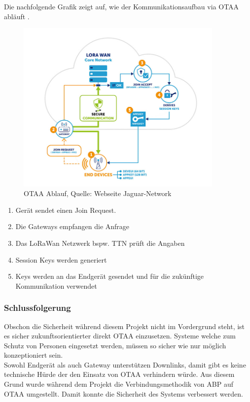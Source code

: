 \documentclass[11pt,english,german]{report}
\theoremstyle{definition}
\begin{document}
\newpage
\noindent
Die nachfolgende Grafik zeigt auf, wie der Kommunikationsaufbau via OTAA abläuft \cite{jaguar}.
\begin{figure}[H]
	\centering
	\includegraphics[width=0.9\textwidth]{img/lora/otaa_schema.png}
	\caption[OTAA Ablauf]
	{OTAA Ablauf, Quelle: Webseite Jaguar-Network \protect\cite{jaguar}}
\end{figure}

\begin{enumerate}
	\item Gerät sendet einen Join Request.
	\item Die Gateways empfangen die Anfrage
	\item Das LoRaWan Netzwerk  bspw. TTN prüft die Angaben
	\item Session Keys werden generiert
	\item Keys werden an das Endgerät gesendet und für die zukünftige Kommunikation verwendet
\end{enumerate}

\newpage
\subsubsection{Schlussfolgerung}
Obschon die Sicherheit während diesem Projekt nicht im Vordergrund steht, ist es sicher zukunftsorientierter direkt OTAA einzusetzen. Systeme welche zum Schutz von Personen eingesetzt werden, müssen so sicher wie nur möglich konzeptioniert sein.\\[0.3cm]
Sowohl Endgerät als auch Gateway unterstützen Downlinks, damit gibt es keine technische Hürde der den Einsatz von OTAA verhindern würde. Aus diesem Grund wurde während dem Projekt die Verbindungsmethodik von ABP auf OTAA umgestellt. Damit konnte die Sicherheit des Systems verbessert werden.
\end{document}
